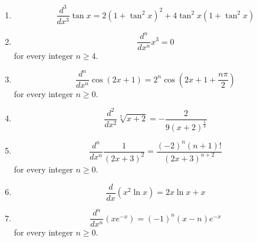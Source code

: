 \documentclass[11pt,a4paper]{article}
\begin{document}
\begin{enumerate}
\item \[ \frac{d^{3}}{dx^{3}} \tan x = 2\left(1+\tan^{2} x\right)^{2} + 4\tan^{2} x \left(1+\tan^{2} x\right) \]
\item \[ \frac{d^{n}}{dx^{n}} x^{3} = 0 \] for every integer $n \ge 4$.
\item \[ \frac{d^{n}}{dx^{n}} \cos\left(2x+1\right) = 2^{n} \cos\left(2x + 1 + \frac{n\pi}{2}\right) \] for every integer $n \ge 0$.
\item \[ \frac{d^{2}}{dx^{2}} \sqrt[3]{x+2} = -\frac{2}{9 \left(x+2\right)^{\frac{5}{3}}} \]
\item \[ \frac{d^{n}}{dx^{n}} \frac{1}{\left(2x+3\right)^{2}} = \frac{\left(-2\right)^{n} \left(n+1\right)!}{\left(2x+3\right)^{n+2}} \] for every integer $n \ge 0$.
\item \[ \frac{d}{dx} \left(x^{2} \ln x\right) = 2x \ln x + x \]
\item \[ \frac{d^{n}}{dx^{n}} \left(x e^{-x}\right) = \left(-1\right)^{n} \left(x - n\right) e^{-x} \] for every integer $n \ge 0$.
\end{enumerate}
\end{document}
